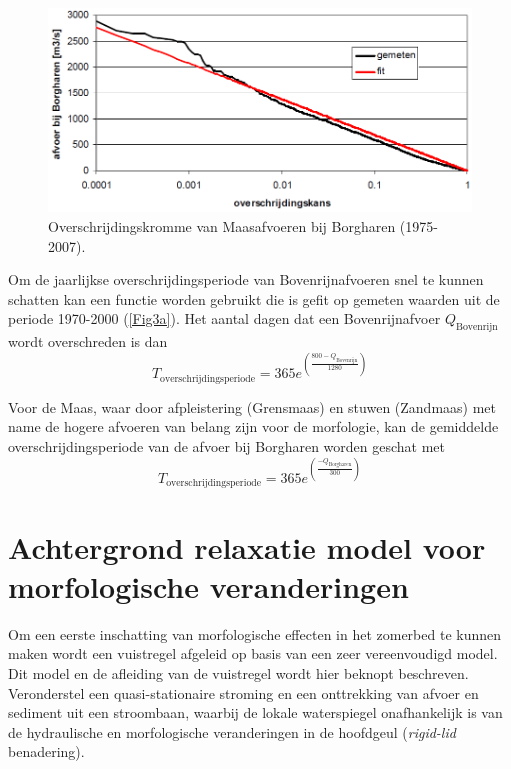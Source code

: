 \begin{figure}
\includegraphics[width=\columnwidth]{figures/Fig3b.png}
\caption{Overschrijdingskromme van Maasafvoeren bij Borgharen (1975-2007).}
\label{Fig3b}
\end{figure}

Om de jaarlijkse overschrijdingsperiode van Bovenrijnafvoeren snel te kunnen schatten kan een functie worden gebruikt die is gefit op gemeten waarden uit de periode 1970-2000 (\autoref{Fig3a}).
Het aantal dagen dat een Bovenrijnafvoer $Q_\text{Bovenrijn}$ wordt overschreden is dan
%
\begin{equation}
\label{Eq1a}
T_\text{overschrijdingsperiode} = 365 e^{\left ( \frac{800 -  Q_\text{Bovenrijn}}{1280} \right )}
\end{equation}

Voor de Maas, waar door afpleistering (Grensmaas) en stuwen (Zandmaas) met name de hogere afvoeren van belang zijn voor de morfologie, kan de gemiddelde overschrijdingsperiode van de afvoer bij Borgharen worden geschat met
%
\begin{equation}
\label{Eq1b}
T_\text{overschrijdingsperiode} = 365 e^{\left ( \frac{-  Q_\text{Borgharen}}{300} \right )}
\end{equation}

\section{Achtergrond relaxatie model voor morfologische veranderingen}

Om een eerste inschatting van morfologische effecten in het zomerbed te kunnen maken wordt een vuistregel afgeleid op basis van een zeer vereenvoudigd model.
Dit model en de afleiding van de vuistregel wordt hier beknopt beschreven.
Veronderstel een quasi-stationaire stroming en een onttrekking van afvoer en sediment uit een stroombaan, waarbij de lokale waterspiegel onafhankelijk is van de hydraulische en morfologische veranderingen in de hoofdgeul (\emph{rigid-lid} benadering).

